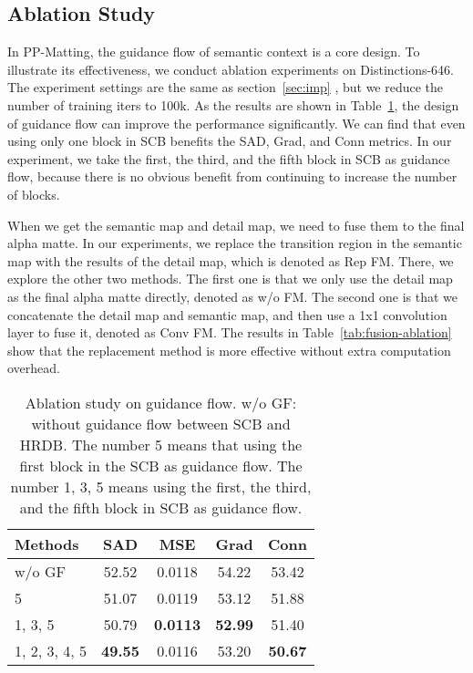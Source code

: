 \documentclass[10pt,twocolumn,letterpaper]{article}
\begin{document}
\subsection{Ablation Study}
In PP-Matting, the guidance flow of semantic context is a core design. To illustrate its effectiveness, we conduct ablation experiments on Distinctions-646. The experiment settings are the same as section~\ref{sec:imp} , but we reduce the number of training iters to 100k. As the results are shown in Table~\ref{tab:flow ablation}, the design of guidance flow can improve the performance significantly. We can find that even using only one block in SCB benefits the SAD, Grad, and Conn metrics. In our experiment, we take the first, the third, and the fifth block in SCB as guidance flow, because there is no obvious benefit from continuing to increase the number of blocks.

When we get the semantic map and detail map, we need to fuse them to the final alpha matte. In our experiments, we replace the transition region in the semantic map with the results of the detail map, which is denoted as Rep FM. There, we explore the other two methods. The first one is that we only use the detail map as the final alpha matte directly, denoted as w/o FM. The second one is that we concatenate the detail map and semantic map, and then use a 1x1 convolution layer to fuse it, denoted as Conv FM. The results in Table~\ref{tab:fusion-ablation} show that the replacement method is more effective without extra computation overhead.

\begin{table}
  \centering
  \begin{tabular}{@{}lcccc@{}}
    \toprule
    Methods & SAD & MSE & Grad & Conn \\
    \midrule
    w/o GF & 52.52 & 0.0118 & 54.22 & 53.42 \\
    5 & 51.07 & 0.0119 & 53.12 & 51.88  \\
    1, 3, 5 &50.79 & \bf{0.0113} & \bf{52.99} & 51.40 \\
    1, 2, 3, 4, 5 & \bf{49.55} & 0.0116 & 53.20 & \bf{50.67} \\
    \bottomrule
  \end{tabular}
  \caption{Ablation study on guidance flow. w/o GF: without guidance flow between SCB and HRDB. The number 5 means that using the first block in the SCB as guidance flow. The number 1, 3, 5 means using the first, the third, and the fifth block in SCB as guidance flow.}
  \label{tab:flow ablation}
\end{table}
\end{document}
